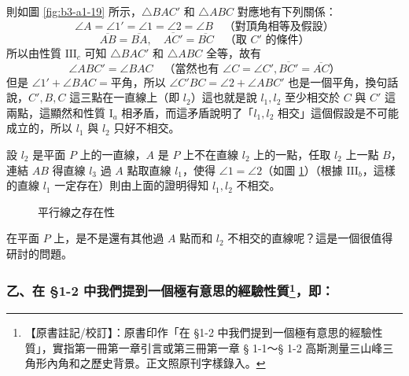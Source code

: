 則如圖 \ref{fig:b3-a1-19} 所示，$\triangle BAC'$ 和 $\triangle ABC$ 對應地有下列關係：
\[ \angle A = \angle 1' = \angle 1 = \angle 2 = \angle B \quad \text{（對頂角相等及假設）} \]
\[ \overline{AB} = \overline{BA}, \quad \overline{AC'} = \overline{BC} \quad \text{（取 $C'$ 的條件）} \]
所以由性質 $\mathrm{III}_c$ 可知 $\triangle BAC'$ 和 $\triangle ABC$ 全等，故有
\[ \angle ABC' = \angle BAC \quad \text{（當然也有 $\angle C = \angle C', \overline{BC'} = \overline{AC}$）} \]
但是 $\angle 1' + \angle BAC = \text{平角}$，所以 $\angle C'BC = \angle 2 + \angle ABC'$ 也是一個平角，換句話說，$C', B, C$ 這三點在一直線上（即 $l_2$）這也就是說 $l_1, l_2$ 至少相交於 $C$ 與 $C'$ 這兩點，這顯然和性質 $\mathrm{I}_a$ 相矛盾，而這矛盾說明了「$l_1, l_2$ 相交」這個假設是不可能成立的，所以 $l_1$ 與 $l_2$ 只好不相交。

設 $l_2$ 是平面 $P$ 上的一直線，$A$ 是 $P$ 上不在直線 $l_2$ 上的一點，任取 $l_2$ 上一點 $B$，連結 $AB$ 得直線 $l_3$ 過 $A$ 點取直線 $l_1$，使得 $\angle 1 = \angle 2$（如圖 \ref{fig:b3-a1-20}）（根據 $\mathrm{III}_b$，這樣的直線 $l_1$ 一定存在）則由上面的證明得知 $l_1, l_2$ 不相交。

\begin{figure}[H]
\centering
{}
\caption{平行線之存在性}
\label{fig:b3-a1-20}
\end{figure}

在平面 $P$ 上，是不是還有其他過 $A$ 點而和 $l_2$ 不相交的直線呢？這是一個很值得研討的問題。

\subsubsection*{乙、在 \S 1-2 中我們提到一個極有意思的經驗性質\label{note:b3-a1-p273-sec}\footnote{【原書註記/校訂】：原書印作「在 \S 1-2 中我們提到一個極有意思的經驗性質」，實指第一冊第一章引言或第三冊第一章 § 1-1～§ 1-2 高斯測量三山峰三角形內角和之歷史背景。正文照原刊字樣錄入。}，即：}

